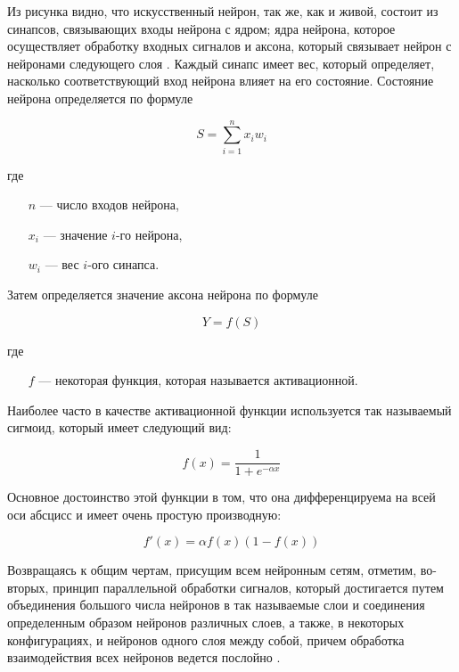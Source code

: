 
Из рисунка видно, что искусственный нейрон, так же, как и живой, состоит из
синапсов, связывающих входы нейрона с ядром; ядра нейрона, которое осуществляет
обработку входных сигналов и аксона, который связывает нейрон с нейронами
следующего слоя \cite{korotkiy}. Каждый синапс имеет вес, который определяет,
насколько соответствующий вход нейрона влияет на его состояние. Состояние
нейрона определяется по формуле

\begin{equation}
S=\sum_{i=1}^{n}x_iw_i
\end{equation}

где
\begin{itemize}
    \item[$n$] — число входов нейрона,
    \item[$x_i$] — значение $i$-го нейрона,
    \item[$w_i$] — вес $i$-ого синапса.
\end{itemize}

Затем определяется значение аксона нейрона по формуле

\begin{equation}
    Y=f(S)
\end{equation}

где
\begin{itemize}
    \item[$f$] — некоторая функция, которая называется активационной.
\end{itemize}

Наиболее часто в качестве активационной функции используется так называемый
сигмоид, который имеет следующий вид:

\begin{equation}
    f(x)=\frac{1}{1+e^{-\alpha x}}
\end{equation}

Основное достоинство этой функции в том, что она дифференцируема на всей оси
абсцисс и имеет очень простую производную:

\begin{equation}
    f'(x)=\alpha f(x)(1-f(x))
\end{equation}

Возвращаясь к общим чертам, присущим всем нейронным сетям, отметим, во-вторых,
принцип параллельной обработки сигналов, который достигается путем объединения
большого числа нейронов в так называемые слои и соединения определенным образом
нейронов различных слоев, а также, в некоторых конфигурациях, и нейронов одного
слоя между собой, причем обработка взаимодействия всех нейронов ведется
послойно \cite{basegroup}.

